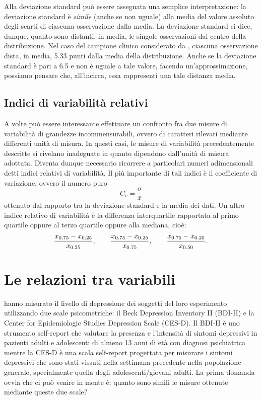 Alla deviazione standard può essere assegnata una semplice interpretazione: la deviazione standard è \emph{simile} (anche se non uguale) alla media del valore assoluto degli scarti di ciascuna osservazione dalla media.
La deviazione standard ci dice, dunque, quanto sono distanti, in media, le singole osservazioni dal centro della distribuzione.
Nel caso del campione clinico considerato da \citet{zetsche_future_2019}, ciascuna osservazione dista, in media, 5.33 punti dalla media della distribuzione.
Anche se la deviazione standard è pari a 6.5 e non è uguale a tale valore, facendo un'approssimazione, possiamo pensare che, all'incirca, essa rappresenti una tale distanza media.


\subsection{Indici di variabilità relativi}

A volte può essere interessante effettuare un confronto fra due misure di variabilità di grandezze incommensurabili, ovvero di caratteri rilevati mediante differenti unità di misura. 
In questi casi, le misure di variabilità precedentemente descritte si rivelano inadeguate in quanto dipendono dall'unità di misura adottata. 
Diventa dunque necessario ricorrere a particolari numeri adimensionali detti indici relativi di variabilità. 
Il più importante di tali indici è il coefficiente di variazione, ovvero il numero puro 
\begin{equation}
C_v = \frac{\sigma}{\bar{x}}
\end{equation}
ottenuto dal rapporto tra la deviazione standard e la media dei dati.
Un altro indice relativo di variabilità è la differenza interquartile rapportata al primo quartile oppure al terzo quartile oppure alla mediana, cioè:
\begin{equation}
\frac{x_{0.75} - x_{0.25}}{x_{0.25}}, \qquad \frac{x_{0.75} - x_{0.25}}{x_{0.75}}, \qquad \frac{x_{0.75} - x_{0.25}}{x_{0.50}}.\notag
\end{equation}


\section{Le relazioni tra variabili}

\citet{zetsche_future_2019} hanno misurato il livello di depressione dei soggetti del loro esperimento utilizzando due scale psicometriche: il Beck Depression Inventory II (BDI-II) e la Center for Epidemiologic Studies Depression Scale (CES-D). 
Il BDI-II è uno strumento self-report che valutare la presenza e l'intensità di sintomi depressivi in pazienti adulti e adolescenti di almeno 13 anni di età con diagnosi psichiatrica mentre la CES-D è una scala self-report progettata per misurare i sintomi depressivi che sono stati vissuti nella settimana precedente nella popolazione generale, specialmente quella degli adolescenti/giovani adulti.
La prima domanda ovvia che ci può venire in mente è: quanto sono simili le misure ottenute mediante queste due scale? 

